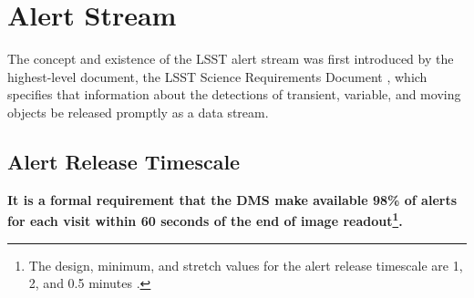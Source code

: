 \documentclass[DM,lsstdraft,authoryear,toc]{lsstdoc}
\begin{document}


\section{Alert Stream} \label{sec:alerts}

The concept and existence of the LSST alert stream was first introduced by the highest-level document, the LSST Science Requirements Document , which specifies that information about the detections of transient, variable, and moving objects be released promptly as a data stream. 


\subsection{Alert Release Timescale}\label{ssec:OTT1}

{\bf It is a formal requirement that the DMS make available 98\% of alerts for each visit within 60 seconds of the end of image readout\footnote{The design, minimum, and stretch values for the alert release timescale are 1, 2, and 0.5 minutes .}.}
\end{document}
